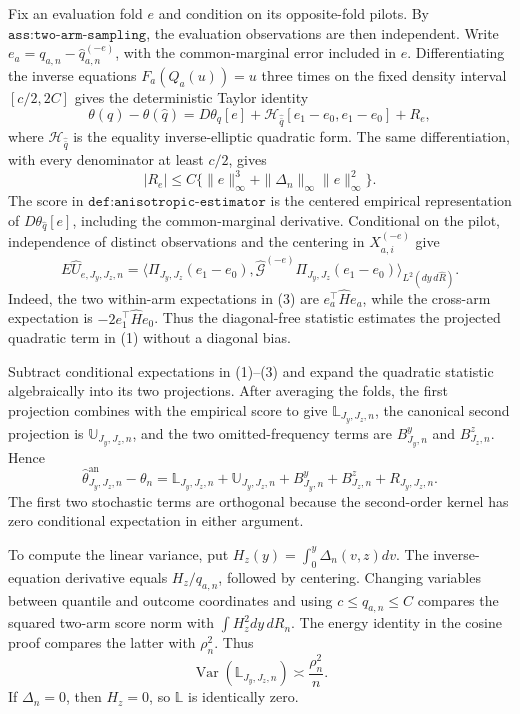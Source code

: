 Fix an evaluation fold \(e\) and condition on its opposite-fold pilots. By \(\texttt{ass:two-arm-sampling}\), the evaluation observations are then independent. Write \(e_a=q_{a,n}-\widehat q_{a,n}^{(-e)}\), with the common-marginal error included in \(e\). Differentiating the inverse equations \(F_a(Q_a(u))=u\) three times on the fixed density interval \([c/2,2C]\) gives the deterministic Taylor identity
\[
\theta(q)-\theta(\widehat q)
=D\theta_{\widehat q}[e]
+\mathcal H_{\widehat{\bar q}}[e_1-e_0,e_1-e_0]+R_e,  \tag{1}
\]
where \(\mathcal H_{\widehat{\bar q}}\) is the equality inverse-elliptic quadratic form. The same differentiation, with every denominator at least \(c/2\), gives
\[
|R_e|\le C\{\|e\|_\infty^3+
\|\Delta_n\|_\infty\|e\|_\infty^2\}.                  \tag{2}
\]
The score in \(\texttt{def:anisotropic-estimator}\) is the centered empirical representation of \(D\theta_{\widehat q}[e]\), including the common-marginal derivative. Conditional on the pilot, independence of distinct observations and the centering in \(X_{a,i}^{(-e)}\) give
\[
E\widehat U_{e,J_y,J_z,n}
=\langle\Pi_{J_y,J_z}(e_1-e_0),
\widehat{\mathcal G}^{(-e)}
\Pi_{J_y,J_z}(e_1-e_0)\rangle_{L^2(dy\,d\widehat R)}. \tag{3}
\]
Indeed, the two within-arm expectations in (3) are \(e_a^\top\widehat He_a\), while the cross-arm expectation is \(-2e_1^\top\widehat He_0\). Thus the diagonal-free statistic estimates the projected quadratic term in (1) without a diagonal bias.

Subtract conditional expectations in (1)--(3) and expand the quadratic statistic algebraically into its two projections. After averaging the folds, the first projection combines with the empirical score to give \(\mathbb L_{J_y,J_z,n}\), the canonical second projection is \(\mathbb U_{J_y,J_z,n}\), and the two omitted-frequency terms are \(B^y_{J_y,n}\) and \(B^z_{J_z,n}\). Hence
\[
\widehat\theta^{\mathrm{an}}_{J_y,J_z,n}-\theta_n
=\mathbb L_{J_y,J_z,n}+\mathbb U_{J_y,J_z,n}
+B^y_{J_y,n}+B^z_{J_z,n}+R_{J_y,J_z,n}.              \tag{4}
\]
The first two stochastic terms are orthogonal because the second-order kernel has zero conditional expectation in either argument.

To compute the linear variance, put \(H_z(y)=\int_0^y\Delta_n(v,z)dv\). The inverse-equation derivative equals \(H_z/q_{a,n}\), followed by centering. Changing variables between quantile and outcome coordinates and using \(c\le q_{a,n}\le C\) compares the squared two-arm score norm with \(\int H_z^2dy\,dR_n\). The energy identity in the cosine proof compares the latter with \(\rho_n^2\). Thus
\[
\operatorname{Var}(\mathbb L_{J_y,J_z,n})
\asymp\frac{\rho_n^2}{n}.                             \tag{5}
\]
If \(\Delta_n=0\), then \(H_z=0\), so \(\mathbb L\) is identically zero.

